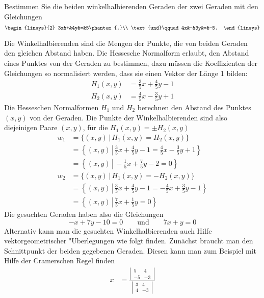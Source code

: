 Bestimmen Sie die beiden winkelhalbierenden Geraden der zwei Geraden
mit den Gleichungen
\[
\begin{linsys}{2}
3x&+&4y&=&5\phantom{.}\\
\text{und}\qquad 4x&-&3y&=&-5.
\end{linsys}
\]


\begin{loesung}
Die Winkelhalbierenden sind die Mengen der Punkte, die von beiden
Geraden den gleichen Abstand haben. Die Hessesche Normalform erlaubt,
den Abstand eines Punktes von der Geraden zu bestimmen, dazu müssen
die Koeffizienten der Gleichungen so normalisiert werden, dass sie
einen Vektor der Länge 1 bilden:
\begin{align*}
H_1(x,y)&=\frac35x+\frac45y-1\\
H_2(x,y)&=\frac45x-\frac35y+1
\end{align*}
Die Hesseschen Normalformen $H_1$ und $H_2$ berechnen den Abstand
des Punktes $(x,y)$ von der Geraden. Die Punkte der Winkelhalbierenden
sind also diejeinigen Paare $(x,y)$, für die $H_1(x,y)=\pm H_2(x,y)$
\begin{align*}
w_1
&=
\{(x,y)\,|\, H_1(x,y)=H_2(x,y)\}
\\
&=
\left\{(x,y)\,\left|\, 
\frac35x+\frac45y-1=\frac45x-\frac35y+1\right.\right\}
\\
&=
\left\{(x,y)\,\left|\,
-\frac15x+\frac75y-2=0
\right.\right\}
\\
w_2&=\{(x,y)\,|\, H_1(x,y)=-H_2(x,y)\}
\\
&=
\left\{(x,y)\,\left|\, 
\frac35x+\frac45y-1=-\frac45x+\frac35y-1\right.\right\}
\\
&=
\left\{(x,y)\,\left|\,
\frac75x+\frac15y=0
\right.\right\}
\end{align*}
Die gesuchten Geraden haben also die Gleichungen
\[
-x+7y-10=0
\qquad
\text{und}
\qquad
7x+y=0
\]
Alternativ kann man die gesuchten Winkelhalbierenden auch Hilfe
vektorgeometrischer "Uberlegungen wie folgt finden.
Zunächst braucht man den Schnittpunkt der beiden gegebenen Geraden.
Diesen kann man zum Beispiel mit Hilfe der Cramerschen Regel
finden
\begin{align*}
x&=\frac{\left|\,\begin{matrix}5&4\\-5&-3\end{matrix}\,\right|}{\left|\,\begin{matrix}3&4\\4&-3\end{matrix}\,\right|}

\end{align*}
\end{loesung}
